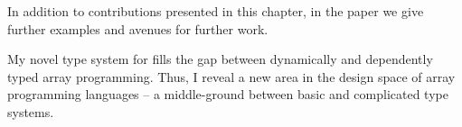 In addition to contributions presented in this chapter, in the paper \cite{star} we give further examples and avenues for further work.

My novel type system for \starr{} fills the gap between dynamically and dependently typed array programming. Thus, I reveal a new area in the design space of array programming languages -- a middle-ground between basic and complicated type systems.


